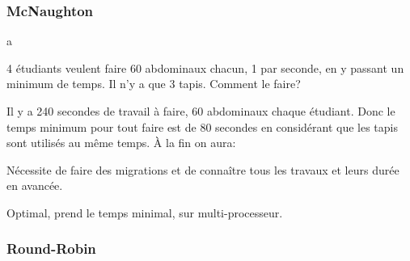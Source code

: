 \documentclass{article}
\begin{document}
\subsubsection{McNaughton}
\begin{definition}
    a
    \begin{example}
        4 étudiants veulent faire 60 abdominaux chacun, 1 par seconde, en y passant un minimum de temps. Il n'y a que 3 tapis. Comment le faire?

        \begin{resolution}
            Il y a 240 secondes de travail à faire, 60 abdominaux chaque étudiant. Donc le temps minimum pour tout faire est de 80 secondes en considérant que les tapis sont utilisés au même temps. À la fin on aura:

        \end{resolution}
    \end{example}

    \begin{remark}
        Nécessite de faire des migrations et de connaître tous les travaux et leurs durée en avancée.
    \end{remark}

    \begin{phrase}
        Optimal, prend le temps minimal, sur multi-processeur.
    \end{phrase}
\end{definition}

\subsubsection{Round-Robin}
\begin{definition}
    
\end{definition}
\end{document}
